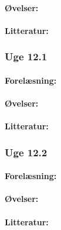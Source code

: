 \documentclass[12pt]{article}
\begin{document}
\paragraph{Øvelser:}
\paragraph{Litteratur:}

\subsubsection{Uge 12.1}
\paragraph{Forelæsning:} 
\paragraph{Øvelser:}
\paragraph{Litteratur:}
\subsubsection{Uge 12.2}
\paragraph{Forelæsning:} 
\paragraph{Øvelser:}
\paragraph{Litteratur:}
\end{document}
